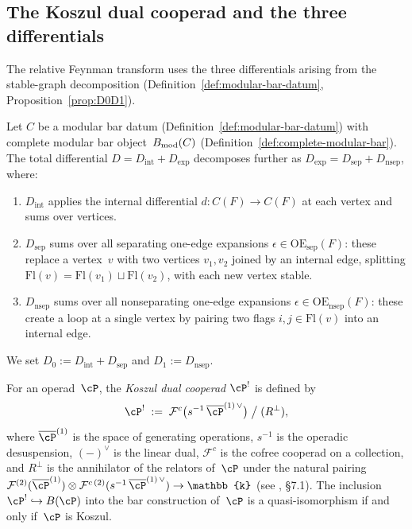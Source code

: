 \subsection{The Koszul dual cooperad and the three differentials}

The relative Feynman transform uses the
three differentials arising from the stable-graph decomposition
(Definition~\ref{def:modular-bar-datum},
Proposition~\ref{prop:D0D1}).

\begin{definition}
\label{def:three-differentials}
Let $C$ be a modular bar datum
(Definition~\ref{def:modular-bar-datum}) with complete modular
bar object~$B_{\mathrm{mod}}(C)$
(Definition~\ref{def:complete-modular-bar}). The total
differential $D = D_{\mathrm{int}} + D_{\mathrm{exp}}$
decomposes further as $D_{\mathrm{exp}} =
D_{\mathrm{sep}} + D_{\mathrm{nsep}}$, where:
\begin{enumerate}[label=\textup{(\roman*)}]
\item $D_{\mathrm{int}}$ applies the internal differential
 $d \colon C(F) \to C(F)$ at each vertex and sums over
 vertices.
\item $D_{\mathrm{sep}}$ sums over all separating one-edge
 expansions $\epsilon \in \mathrm{OE}_{\mathrm{sep}}(F)$: these
 replace a vertex~$v$ with two vertices $v_1, v_2$ joined by
 an internal edge, splitting
 $\mathrm{Fl}(v) = \mathrm{Fl}(v_1) \sqcup \mathrm{Fl}(v_2)$,
 with each new vertex stable.
\item $D_{\mathrm{nsep}}$ sums over all nonseparating one-edge
 expansions $\epsilon \in \mathrm{OE}_{\mathrm{nsep}}(F)$: these
 create a loop at a single vertex by pairing two flags $i,j
 \in \mathrm{Fl}(v)$ into an internal edge.
\end{enumerate}
We set $D_0 := D_{\mathrm{int}} + D_{\mathrm{sep}}$ and
$D_1 := D_{\mathrm{nsep}}$.
\end{definition}

\begin{definition}
\label{def:koszul-dual-cooperad}
For an operad~$\cP$, the \emph{Koszul dual cooperad}
$\cP^{!}$ is defined by
\[
\cP^{!}
\;:=\;
\mathcal{F}^c
\bigl(s^{-1}\,
\overline{\cP}^{(1)\,\vee}\bigr)
\;\big/\;
(R^\perp),
\]
where $\overline{\cP}^{(1)}$ is the space of generating
operations, $s^{-1}$ is the operadic desuspension,
$(-)^\vee$ is the linear dual, $\mathcal{F}^c$ is the cofree
cooperad on a collection, and $R^\perp$ is the annihilator of
the relators of~$\cP$ under the natural pairing
$\mathcal{F}^{(2)}(\overline{\cP}^{(1)}) \otimes
\mathcal{F}^{c\,(2)}(s^{-1}\,
\overline{\cP}^{(1)\,\vee}) \to \mathbb{k}$
(see \cite{LV12}, \S7.1).
The inclusion $\cP^{!} \hookrightarrow
B(\cP)$ into the bar construction of~$\cP$ is a
quasi-isomorphism if and only if~$\cP$ is Koszul.
\end{definition}

